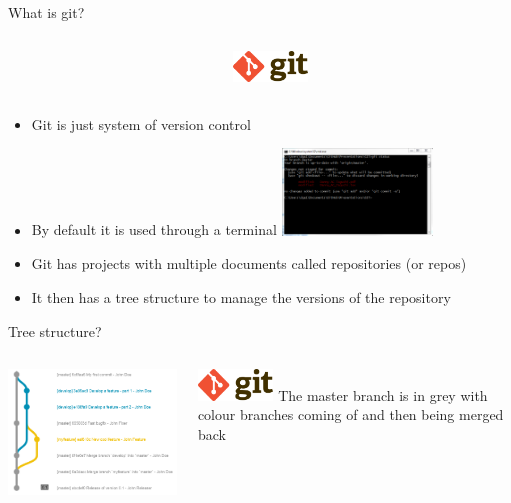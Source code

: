 \documentclass[10pt]{beamer}
\begin{document}
\begin{frame}[fragile]{What is git?}
\begin{columns}[T]
\begin{column}{.8\textwidth}
\end{column}
\begin{column}{.2\textwidth}
\includegraphics[width=2cm]{Figs/Git-logo}
\end{column}
\end{columns}
\begin{itemize}
\item Git is just system of version control
\item By default it is used through a terminal
\includegraphics[width=4cm]{Figs/git/status}
\item Git has projects with multiple documents called repositories (or repos)
\item It then has a tree structure to manage the versions of the repository 
\end{itemize}
\end{frame}


\begin{frame}[fragile]{Tree structure?}
\begin{columns}[T]
\begin{column}{.8\textwidth}
\includegraphics[width=9cm]{Figs/git/tree}
\end{column}
\begin{column}{.2\textwidth}
\includegraphics[width=2cm]{Figs/Git-logo} \newline \newline
The master branch is in grey with colour branches coming of and then being merged back
\end{column}
\end{columns}
\end{frame}
\end{document}
